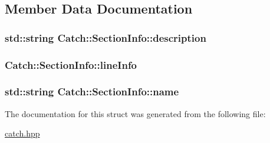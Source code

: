 \subsection{Member Data Documentation}
\hypertarget{struct_catch_1_1_section_info_a0052060219a6de74bb7ade34d4163a4e}{
\subsubsection[{description}]{\setlength{\rightskip}{0pt plus 5cm}std\-::string Catch\-::\-Section\-Info\-::description}}\label{struct_catch_1_1_section_info_a0052060219a6de74bb7ade34d4163a4e}
\hypertarget{struct_catch_1_1_section_info_adbc83b8a3507c4acc8ee249e93465711}{
\subsubsection[{line\-Info}]{ Catch\-::\-Section\-Info\-::line\-Info}}\label{struct_catch_1_1_section_info_adbc83b8a3507c4acc8ee249e93465711}
\hypertarget{struct_catch_1_1_section_info_a704c8fc662d309137e0d4f199cb7df58}{
\subsubsection[{name}]{\setlength{\rightskip}{0pt plus 5cm}std\-::string Catch\-::\-Section\-Info\-::name}}\label{struct_catch_1_1_section_info_a704c8fc662d309137e0d4f199cb7df58}


The documentation for this struct was generated from the following file\-:\begin{DoxyCompactItemize}
\item 
\hyperlink{catch_8hpp}{catch.\-hpp}\end{DoxyCompactItemize}
